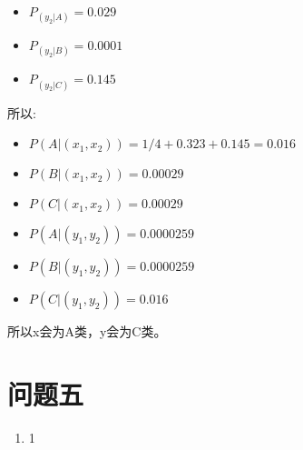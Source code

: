 \documentclass[answers]{exam}  %
\begin{document}
\begin{enumerate}[label=\alph*.]
\begin{itemize}
        \item $P_{(y_2|A)} = 0.029$
        \item $P_{(y_2|B)} = 0.0001$
        \item $P_{(y_2|C)} = 0.145$
    \end{itemize}
    所以:
    \begin{itemize}
        \item $P(A|(x_1,x_2)) = 1/4 + 0.323 + 0.145 = 0.016$
        \item $P(B|(x_1,x_2)) = 0.00029$
        \item $P(C|(x_1,x_2)) = 0.00029$
        \item $P(A|(y_1,y_2)) = 0.0000259$
        \item $P(B|(y_1,y_2)) = 0.0000259$
        \item $P(C|(y_1,y_2)) = 0.016$
    \end{itemize}
    所以x会为A类，y会为C类。
\end{enumerate}

\section{问题五}
\begin{enumerate}[label=\alph*.] 
    \item 1
\end{enumerate}
\end{document}
